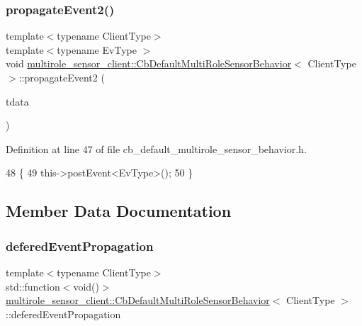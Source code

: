 \subsubsection{\texorpdfstring{propagate\+Event2()}{propagateEvent2()}}
{\footnotesize\ttfamily template$<$typename Client\+Type$>$ \\
template$<$typename Ev\+Type $>$ \\
void \hyperlink{classmultirole__sensor__client_1_1CbDefaultMultiRoleSensorBehavior}{multirole\+\_\+sensor\+\_\+client\+::\+Cb\+Default\+Multi\+Role\+Sensor\+Behavior}$<$ Client\+Type $>$\+::propagate\+Event2 (\begin{DoxyParamCaption}\item[{const ros\+::\+Timer\+Event \&}]{tdata }\end{DoxyParamCaption})\hspace{0.3cm}{\ttfamily [inline]}}



Definition at line 47 of file cb\+\_\+default\+\_\+multirole\+\_\+sensor\+\_\+behavior.\+h.


\begin{DoxyCode}
48   \{
49     this->postEvent<EvType>();
50   \}
\end{DoxyCode}


\subsection{Member Data Documentation}
\mbox{\label{classmultirole__sensor__client_1_1CbDefaultMultiRoleSensorBehavior_af49bfde7f78897b0e884faae69077013}} 
\subsubsection{\texorpdfstring{defered\+Event\+Propagation}{deferedEventPropagation}}
{\footnotesize\ttfamily template$<$typename Client\+Type$>$ \\
std\+::function$<$void()$>$ \hyperlink{classmultirole__sensor__client_1_1CbDefaultMultiRoleSensorBehavior}{multirole\+\_\+sensor\+\_\+client\+::\+Cb\+Default\+Multi\+Role\+Sensor\+Behavior}$<$ Client\+Type $>$\+::defered\+Event\+Propagation}



